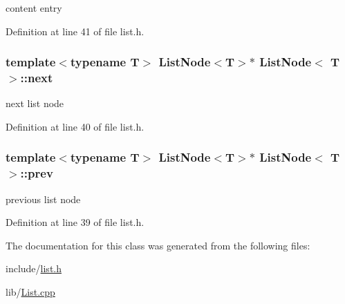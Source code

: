 content entry 



Definition at line 41 of file list.\-h.

\hypertarget{class_list_node_a97909c9598053ffd24b77ec715f745f1}{
\subsubsection[{next}]{\setlength{\rightskip}{0pt plus 5cm}template$<$typename T$>$ {\bf List\-Node}$<$T$>$$\ast$ {\bf List\-Node}$<$ T $>$\-::next\hspace{0.3cm}{\ttfamily [private]}}}\label{class_list_node_a97909c9598053ffd24b77ec715f745f1}


next list node 



Definition at line 40 of file list.\-h.

\hypertarget{class_list_node_a997ca532d810ebd030726ff880ba76b5}{
\subsubsection[{prev}]{\setlength{\rightskip}{0pt plus 5cm}template$<$typename T$>$ {\bf List\-Node}$<$T$>$$\ast$ {\bf List\-Node}$<$ T $>$\-::prev\hspace{0.3cm}{\ttfamily [private]}}}\label{class_list_node_a997ca532d810ebd030726ff880ba76b5}


previous list node 



Definition at line 39 of file list.\-h.



The documentation for this class was generated from the following files\-:\begin{DoxyCompactItemize}
\item 
include/\hyperlink{list_8h}{list.\-h}\item 
lib/\hyperlink{_list_8cpp}{List.\-cpp}\end{DoxyCompactItemize}

